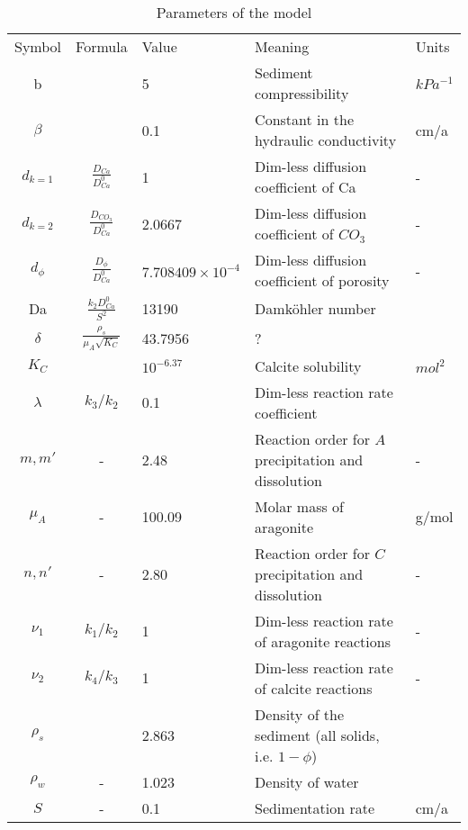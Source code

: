 \documentclass[10pt, letterpaper]{article}
\begin{document}
\begin{table}
    \centering
    \begin{tabular}{cclll}
 Symbol& Formula& Value&Meaning &Units\\
 b& & 5& Sediment compressibility&$kPa^{-1}$\\
 $\beta$& & 0.1& Constant in the hydraulic conductivity&cm/a\\
 $d_{k=1}$& $\frac{D_{Ca}}{D_{Ca}^0}$& 1& Dim-less diffusion coefficient of Ca&-\\
 $d_{k=2}$& $\frac{D_{CO_{3}}}{D_{Ca}^0}$& 2.0667& Dim-less diffusion coefficient of $CO_3$&-\\
 $d_\phi$& $\frac{D_\phi}{D_{Ca}^0}$& $7.708409\times10^{-4}$& Dim-less diffusion coefficient of porosity&-\\
         Da&  $\frac{k_2D_{Ca}^0}{S^2}$& 13190&Damköhler number &\\
 $\delta$& $\frac{\rho_s}{\mu_A\sqrt{K_C}}$& 43.7956& ?&\\
 $K_C$& & $10^{-6.37}$& Calcite solubility&$mol^2$\\
         $\lambda$&  $k_3/k_2$& 0.1& Dim-less reaction rate coefficient&\\
 $m, m'$& -& 2.48&Reaction order for $A$ precipitation and dissolution&-\\
 $\mu_A$& -& 100.09& Molar mass of aragonite&g/mol\\
 $n, n'$& -& 2.80&Reaction order for $C$ precipitation and dissolution&-\\
         $\nu_1$&  $k_1/k_2$& 1& Dim-less reaction rate of aragonite reactions&-\\
         $\nu_2$&  $k_4/k_3$& 1& Dim-less reaction rate of calcite reactions&-\\
         $\rho_s$&  & 2.863& Density of the sediment (all solids, i.e. $1 - \phi$)&\\
         $\rho_w$&  -& 1.023& Density of water&\\
 $S$& -& 0.1& Sedimentation rate&cm/a\\
    \end{tabular}
    \caption{Parameters of the model}
\end{table}
\end{document}
